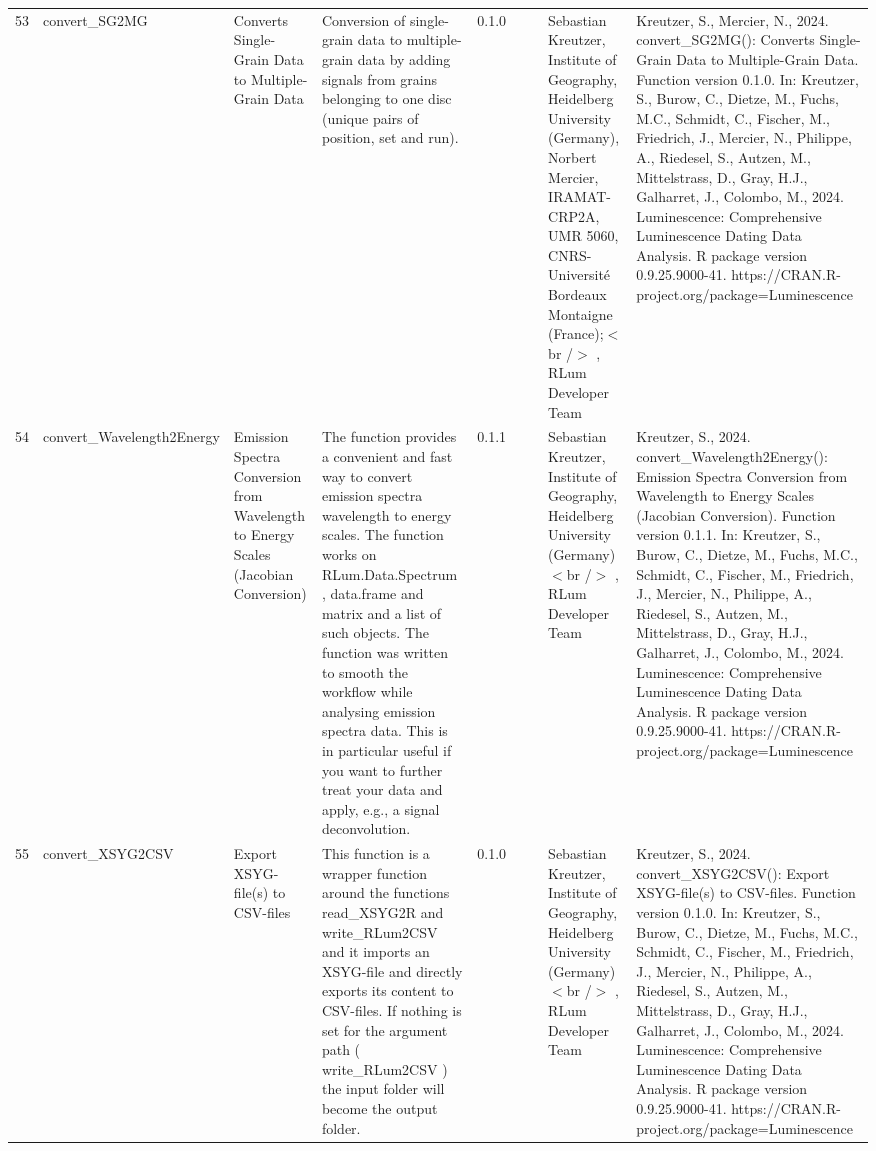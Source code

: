 \begin{table}[ht]
\begin{tabular}{rllllllll}
 \\ 
  53 & convert\_SG2MG & Converts Single-Grain Data to Multiple-Grain Data & Conversion of single-grain data to multiple-grain data by adding signals from grains belonging to one disc (unique pairs of position, set and run). & 0.1.0
 &  &  & Sebastian Kreutzer, Institute of Geography, Heidelberg University (Germany), Norbert Mercier, IRAMAT-CRP2A, UMR 5060, CNRS-Université Bordeaux Montaigne (France);$<$br /$>$ , RLum Developer Team & Kreutzer, S., Mercier, N., 2024. convert\_SG2MG(): Converts Single-Grain Data to Multiple-Grain Data. Function version 0.1.0. In: Kreutzer, S., Burow, C., Dietze, M., Fuchs, M.C., Schmidt, C., Fischer, M., Friedrich, J., Mercier, N., Philippe, A., Riedesel, S., Autzen, M., Mittelstrass, D., Gray, H.J., Galharret, J., Colombo, M., 2024. Luminescence: Comprehensive Luminescence Dating Data Analysis. R package version 0.9.25.9000-41. https://CRAN.R-project.org/package=Luminescence
 \\ 
  54 & convert\_Wavelength2Energy & Emission Spectra Conversion from Wavelength to Energy Scales (Jacobian Conversion) & The function provides a convenient and fast way to convert emission spectra wavelength to energy scales. The function works on  RLum.Data.Spectrum ,  data.frame  and  matrix  and a  list  of such objects. The function was written to smooth the workflow while analysing emission spectra data. This is in particular useful if you want to further treat your data and apply, e.g., a signal deconvolution. & 0.1.1
 &  &  & Sebastian Kreutzer, Institute of Geography, Heidelberg University (Germany)$<$br /$>$ , RLum Developer Team & Kreutzer, S., 2024. convert\_Wavelength2Energy(): Emission Spectra Conversion from Wavelength to Energy Scales (Jacobian Conversion). Function version 0.1.1. In: Kreutzer, S., Burow, C., Dietze, M., Fuchs, M.C., Schmidt, C., Fischer, M., Friedrich, J., Mercier, N., Philippe, A., Riedesel, S., Autzen, M., Mittelstrass, D., Gray, H.J., Galharret, J., Colombo, M., 2024. Luminescence: Comprehensive Luminescence Dating Data Analysis. R package version 0.9.25.9000-41. https://CRAN.R-project.org/package=Luminescence
 \\ 
  55 & convert\_XSYG2CSV & Export XSYG-file(s) to CSV-files & This function is a wrapper function around the functions  read\_XSYG2R  and write\_RLum2CSV  and it imports an XSYG-file and directly exports its content to CSV-files. If nothing is set for the argument  path  ( write\_RLum2CSV ) the input folder will become the output folder. & 0.1.0
 &  &  & Sebastian Kreutzer, Institute of Geography, Heidelberg University (Germany)$<$br /$>$ , RLum Developer Team & Kreutzer, S., 2024. convert\_XSYG2CSV(): Export XSYG-file(s) to CSV-files. Function version 0.1.0. In: Kreutzer, S., Burow, C., Dietze, M., Fuchs, M.C., Schmidt, C., Fischer, M., Friedrich, J., Mercier, N., Philippe, A., Riedesel, S., Autzen, M., Mittelstrass, D., Gray, H.J., Galharret, J., Colombo, M., 2024. Luminescence: Comprehensive Luminescence Dating Data Analysis. R package version 0.9.25.9000-41. https://CRAN.R-project.org/package=Luminescence

\end{tabular}
\end{table}
